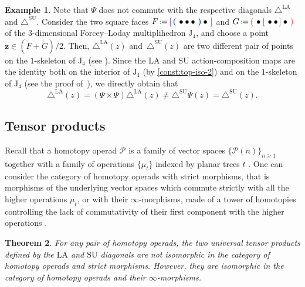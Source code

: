\documentclass{amsart}
\newtheorem{theorem}{Theorem}[section]
\theoremstyle{definition}
\newtheorem{example}[theorem]{Example}
\renewcommand{\b}[1]{{\boldsymbol{#1}}} %
\newcommand{\J}{\mathrm{J}} %
\newcommand{\eqdef}{\mbox{\,\raisebox{0.2ex}{\scriptsize\ensuremath{\mathrm:}}\ensuremath{=}\,}} %
\newcommand{\bluea}[1]{\textcolor{MidnightBlue}{\boldsymbol{\left(\right.}} #1 \textcolor{MidnightBlue}{\boldsymbol{\left.\right)}}}
\newcommand{\reda}[1]{\textcolor{Red!60}{\boldsymbol{\left(\right.}} #1 \textcolor{Red!60}{\boldsymbol{\left.\right)}}}
\newcommand{\purplea}[1]{\textcolor{Purple!80}{\boldsymbol{\left[\right.}} #1 \textcolor{Purple!80}{\boldsymbol{\left.\right]}}}
\renewcommand{\b}[1]{\boldsymbol{#1}} %
\newcommand{\SU}{\mathrm{SU}}
\newcommand{\LA}{\mathrm{LA}}
\newcommand{\SUD}{\triangle^{\mathrm{SU}}}
\newcommand{\LAD}{\triangle^{\mathrm{LA}}}
\begin{document}
\begin{example}
	\label{ex:iso-not-Hopf-2}
	Note that $\Psi$ does not commute with the respective diagonals $\LAD$ and $\SUD$. 
	Consider the two square faces $F \eqdef \purplea{\bluea{\bullet \bullet \bullet}\bullet}$ and $G \eqdef \reda{\bullet\purplea{\bullet\bullet}\bullet}$ of the $3$-dimensional Forcey--Loday multiplihedron $\J_4$, and choose a point $\b z \in (\mathring F + \mathring G)/2$.
	Then, $\LAD(z)$ and~$\SUD(z)$ are two different pair of points on the $1$-skeleton of $\J_4$ (see \cite[Ex.~3.7 \& Fig.~9]{LaplanteAnfossiMazuir}). 
	Since the $\LA$ and $\SU$ action-composition maps are the identity both on the interior of $\J_4$ (by \cref{const:top-iso-2}) and on the $1$-skeleton of $\J_4$ (see the proof of~\cite[Prop. 7]{MasudaThomasTonksVallette}), we directly obtain that
	\[
	{\LAD(z)=(\Psi \times \Psi)\LAD(z) \neq \SUD \Psi(z)=\SUD(z)}.
	\] 
\end{example}



\subsection{Tensor products}
\label{subsec:tensor-products}
Recall that a homotopy operad $\mathcal{P}$ is a family of vector spaces $\{\mathcal{P}(n)\}_{n \geq 1}$ together with a family of operations $\{\mu_t\}$ indexed by planar trees $t$ \cite[Def. 4.11]{LaplanteAnfossi}.
One can consider the category of homotopy operads with strict morphisms, that is morphisms of the underlying vector spaces which commute strictly with all the higher operations $\mu_t$, or with their $\infty$-morphisms, made of a tower of homotopies controlling the lack of commutativity of their first component with the higher operations \cite[Sec. 10.5.2]{LodayVallette}.

\begin{theorem}
\label{thm:infinity-iso}
For any pair of homotopy operads, the two universal tensor products defined by the $\LA$ and $\SU$ diagonals are not isomorphic in the category of homotopy operads and strict morphisms.
However, they are isomorphic in the category of homotopy operads and their $\infty$-morphisms.
\end{theorem}
\end{document}
